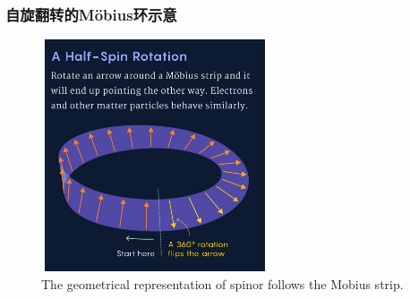 {\frame
{
	\frametitle{自旋翻转的\textrm{M\"obius}环示意}
	\begin{figure}[h!]
\centering
\vspace*{-0.10in}
\includegraphics[height=2.7in,width=2.65in,viewport=0 0 1120 1170,clip]{Figures/spin_half_mobius_2.jpg}
\caption{\tiny \textrm{The geometrical representation of spinor follows the Mobius strip.}}%
\label{Fig:Mobius}
\end{figure}
}

}
